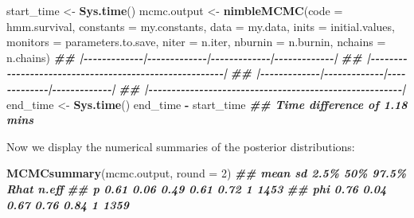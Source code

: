 \documentclass[
  12pt,
]{krantz}
\newenvironment{Shaded}{\begin{snugshade}}{\end{snugshade}}
\newcommand{\AttributeTok}[1]{\textcolor[rgb]{0.13,0.29,0.53}{#1}}
\newcommand{\DecValTok}[1]{\textcolor[rgb]{0.00,0.00,0.81}{#1}}
\newcommand{\DocumentationTok}[1]{\textcolor[rgb]{0.56,0.35,0.01}{\textbf{\textit{#1}}}}
\newcommand{\FunctionTok}[1]{\textcolor[rgb]{0.13,0.29,0.53}{\textbf{#1}}}
\newcommand{\NormalTok}[1]{#1}
\newcommand{\OtherTok}[1]{\textcolor[rgb]{0.56,0.35,0.01}{#1}}
\newcommand{\SpecialCharTok}[1]{\textcolor[rgb]{0.81,0.36,0.00}{\textbf{#1}}}
\begin{document}
\begin{Shaded}
\begin{Highlighting}[]
\NormalTok{start\_time }\OtherTok{\textless{}{-}} \FunctionTok{Sys.time}\NormalTok{()}
\NormalTok{mcmc.output }\OtherTok{\textless{}{-}} \FunctionTok{nimbleMCMC}\NormalTok{(}\AttributeTok{code =}\NormalTok{ hmm.survival,}
                          \AttributeTok{constants =}\NormalTok{ my.constants,}
                          \AttributeTok{data =}\NormalTok{ my.data,}
                          \AttributeTok{inits =}\NormalTok{ initial.values,}
                          \AttributeTok{monitors =}\NormalTok{ parameters.to.save,}
                          \AttributeTok{niter =}\NormalTok{ n.iter,}
                          \AttributeTok{nburnin =}\NormalTok{ n.burnin,}
                          \AttributeTok{nchains =}\NormalTok{ n.chains)}
\DocumentationTok{\#\# |{-}{-}{-}{-}{-}{-}{-}{-}{-}{-}{-}{-}{-}|{-}{-}{-}{-}{-}{-}{-}{-}{-}{-}{-}{-}{-}|{-}{-}{-}{-}{-}{-}{-}{-}{-}{-}{-}{-}{-}|{-}{-}{-}{-}{-}{-}{-}{-}{-}{-}{-}{-}{-}|}
\DocumentationTok{\#\# |{-}{-}{-}{-}{-}{-}{-}{-}{-}{-}{-}{-}{-}{-}{-}{-}{-}{-}{-}{-}{-}{-}{-}{-}{-}{-}{-}{-}{-}{-}{-}{-}{-}{-}{-}{-}{-}{-}{-}{-}{-}{-}{-}{-}{-}{-}{-}{-}{-}{-}{-}{-}{-}{-}{-}|}
\DocumentationTok{\#\# |{-}{-}{-}{-}{-}{-}{-}{-}{-}{-}{-}{-}{-}|{-}{-}{-}{-}{-}{-}{-}{-}{-}{-}{-}{-}{-}|{-}{-}{-}{-}{-}{-}{-}{-}{-}{-}{-}{-}{-}|{-}{-}{-}{-}{-}{-}{-}{-}{-}{-}{-}{-}{-}|}
\DocumentationTok{\#\# |{-}{-}{-}{-}{-}{-}{-}{-}{-}{-}{-}{-}{-}{-}{-}{-}{-}{-}{-}{-}{-}{-}{-}{-}{-}{-}{-}{-}{-}{-}{-}{-}{-}{-}{-}{-}{-}{-}{-}{-}{-}{-}{-}{-}{-}{-}{-}{-}{-}{-}{-}{-}{-}{-}{-}|}
\NormalTok{end\_time }\OtherTok{\textless{}{-}} \FunctionTok{Sys.time}\NormalTok{()}
\NormalTok{end\_time }\SpecialCharTok{{-}}\NormalTok{ start\_time}
\DocumentationTok{\#\# Time difference of 1.18 mins}
\end{Highlighting}
\end{Shaded}

Now we display the numerical summaries of the posterior distributions:

\begin{Shaded}
\begin{Highlighting}[]
\FunctionTok{MCMCsummary}\NormalTok{(mcmc.output, }\AttributeTok{round =} \DecValTok{2}\NormalTok{)}
\DocumentationTok{\#\#     mean   sd 2.5\%  50\% 97.5\% Rhat n.eff}
\DocumentationTok{\#\# p   0.61 0.06 0.49 0.61  0.72    1  1453}
\DocumentationTok{\#\# phi 0.76 0.04 0.67 0.76  0.84    1  1359}
\end{Highlighting}
\end{Shaded}
\end{document}
